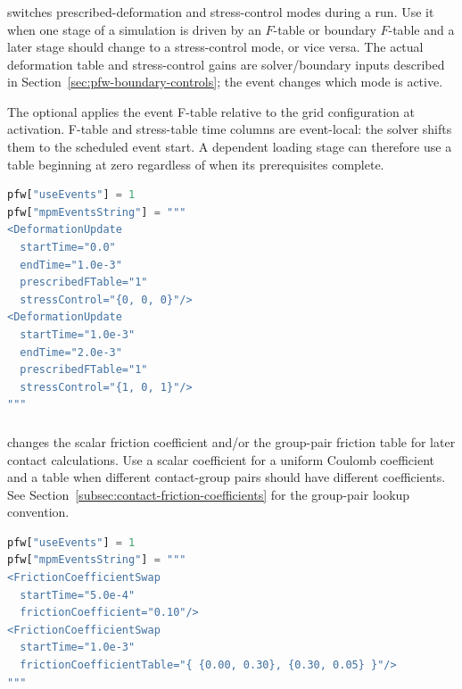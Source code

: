 \subsubsection{}

 switches prescribed-deformation and stress-control modes during a run.  Use it when one stage of a simulation is driven by an \(F\)-table or boundary \(F\)-table and a later stage should change to a stress-control mode, or vice versa.  The actual deformation table and stress-control gains are solver/boundary inputs described in Section~\ref{sec:pfw-boundary-controls}; the event changes which mode is active.

The optional  applies the event F-table relative to the grid configuration at activation. F-table and stress-table time columns are event-local: the solver shifts them to the scheduled event start. A dependent loading stage can therefore use a table beginning at zero regardless of when its prerequisites complete.

\begin{lstlisting}[language=Python,caption={Deformation-control update event.}]
pfw["useEvents"] = 1
pfw["mpmEventsString"] = """
<DeformationUpdate
  startTime="0.0"
  endTime="1.0e-3"
  prescribedFTable="1"
  stressControl="{0, 0, 0}"/>
<DeformationUpdate
  startTime="1.0e-3"
  endTime="2.0e-3"
  prescribedFTable="1"
  stressControl="{1, 0, 1}"/>
"""
\end{lstlisting}

\subsubsection{}

 changes the scalar friction coefficient and/or the group-pair friction table for later contact calculations.  Use a scalar coefficient for a uniform Coulomb coefficient and a table when different contact-group pairs should have different coefficients.  See Section~\ref{subsec:contact-friction-coefficients} for the group-pair lookup convention.

\begin{lstlisting}[language=Python,caption={Friction-coefficient swap event.}]
pfw["useEvents"] = 1
pfw["mpmEventsString"] = """
<FrictionCoefficientSwap
  startTime="5.0e-4"
  frictionCoefficient="0.10"/>
<FrictionCoefficientSwap
  startTime="1.0e-3"
  frictionCoefficientTable="{ {0.00, 0.30}, {0.30, 0.05} }"/>
"""
\end{lstlisting}

